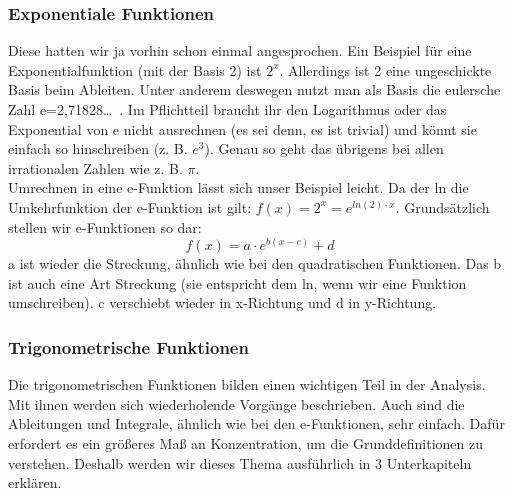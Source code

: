 	\subsubsection{Exponentiale Funktionen}
		Diese hatten wir ja vorhin schon einmal angesprochen. Ein Beispiel für eine
		Exponentialfunktion (mit der Basis 2) ist \(2^x\). Allerdings ist 2 eine
		ungeschickte Basis beim Ableiten. Unter anderem deswegen nutzt man als Basis
		die eulersche Zahl e=2,71828\ldots \ . Im Pflichtteil braucht ihr den
		Logarithmus oder das Exponential von e nicht ausrechnen (es sei denn, es ist
		trivial) und könnt sie einfach so hinschreiben (z. B. \(e^3\)). Genau so geht
		das übrigens bei allen irrationalen Zahlen wie z. B. \(\pi\).\\
		Umrechnen in eine e-Funktion lässt sich unser Beispiel leicht. Da der ln die
		Umkehrfunktion der e-Funktion ist gilt: \(f(x)=2^x=e^{ln(2)\cdot x}\).
		Grundsätzlich stellen wir e-Funktionen so dar:
		\[f(x)=a \cdot e^{b(x-c)}+d\]
		a ist wieder die Streckung, ähnlich wie bei den quadratischen Funktionen. Das
		b ist auch eine Art Streckung (sie entspricht dem ln, wenn wir eine Funktion
		umschreiben). c verschiebt wieder in x-Richtung und d in y-Richtung.\\

	\subsubsection{Trigonometrische Funktionen}
		Die trigonometrischen Funktionen bilden einen wichtigen Teil in der Analysis.
		Mit ihnen werden sich wiederholende Vorgänge beschrieben. Auch sind die
		Ableitungen und Integrale, ähnlich wie bei den e-Funktionen, sehr einfach.
		Dafür erfordert es ein größeres Maß an Konzentration, um die Grunddefinitionen
		zu verstehen. Deshalb werden wir dieses Thema ausführlich in 3 Unterkapiteln
		erklären.
